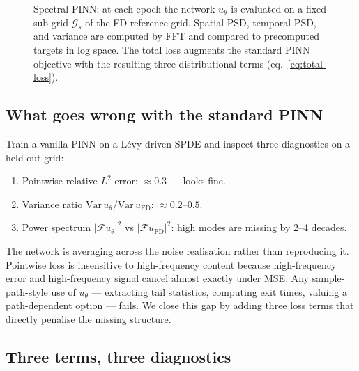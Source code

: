 \documentclass[review,12pt]{elsarticle}
\begin{document}
\begin{figure}[t]
  \centering
  \caption{Spectral PINN: at each epoch the network $u_\theta$ is
  evaluated on a fixed sub-grid $\mathcal{G}_s$ of the FD reference
  grid. Spatial PSD, temporal PSD, and variance are computed by FFT
  and compared to precomputed targets in log space. The total loss
  augments the standard PINN objective with the resulting three
  distributional terms (eq.~\ref{eq:total-loss}).}
  \label{fig:method-schematic}
\end{figure}

\subsection{What goes wrong with the standard PINN}

Train a vanilla PINN on a L\'evy-driven SPDE and inspect three
diagnostics on a held-out grid:
\begin{enumerate}
\item Pointwise relative \(L^2\) error: \(\approx 0.3\) --- looks fine.
\item Variance ratio
\(\mathrm{Var}\,u_\theta / \mathrm{Var}\,u_{\mathrm{FD}}\):
\(\approx 0.2\)--\(0.5\).
\item Power spectrum \(|\mathcal F u_\theta|^2\) vs
\(|\mathcal F u_{\mathrm{FD}}|^2\): high modes are missing by 2--4
decades.
\end{enumerate}
The network is averaging across the noise realisation rather than
reproducing it. Pointwise loss is insensitive to high-frequency
content because high-frequency error and high-frequency signal
cancel almost exactly under MSE. Any sample-path-style use of
\(u_\theta\) --- extracting tail statistics, computing exit times,
valuing a path-dependent option --- fails. We close this gap by
adding three loss terms that directly penalise the missing
structure.

\subsection{Three terms, three diagnostics}
\label{subsec:losses}
\end{document}
